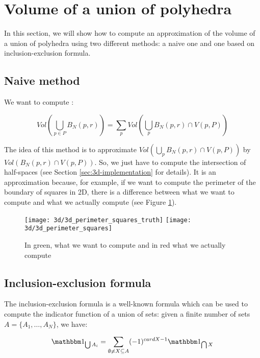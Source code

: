\section{Volume of a union of polyhedra}

In this section, we will show how to compute an approximation of the volume of
a union of polyhedra using two different methods: a naive one and one based on
inclusion-exclusion formula.

\subsection{Naive method}
We want to compute :

\begin{equation}
    Vol(\bigcup_{p \in P} B_N(p, r)) = \sum_p Vol(\bigcup_p B_N(p, r) \cap V(p, P))
\end{equation}

The idea of this method is to approximate $ Vol(\bigcup_p B_N(p, r) \cap V(p,
P)) $ by $ Vol(B_N(p, r) \cap V(p, P)) $. So, we just have to compute the
intersection of half-spaces (see Section \ref{sec:3d-implementation} for
details). It is an approximation because, for example, if we want to compute the
perimeter of the boundary of squares in 2D, there is a difference between what
we want to compute and what we actually compute (see Figure
\ref{fig:3d-inclusion-exclusion-squares}).

\begin{figure}[h]
    \centering

    \texttt{[image: 3d/3d\_perimeter\_squares\_truth]}
    \hspace{2cm}
    \texttt{[image: 3d/3d\_perimeter\_squares]}
    \caption{In green, what we want to compute and in red what we actually compute}
    \label{fig:3d-inclusion-exclusion-squares}
\end{figure}

\subsection{Inclusion-exclusion formula}

The inclusion-exclusion formula is a well-known formula which can be used to
compute the indicator function of a union of sets: given a finite number of sets
$ A = \{ A_1, \ldots, A_N \} $, we have:

\begin{equation}
    \indicator{\bigcup A_i} = \sum_{\emptyset \neq X \subseteq A} (-1)^{card X -
        1} \indicator{\bigcap X}
\end{equation}

